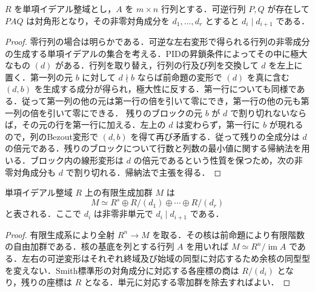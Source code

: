 \begin{prop}[Smith標準形]
$R$ を単項イデアル整域とし，$A$ を $m\times n$ 行列とする．可逆行列 $P,Q$ が存在して $PAQ$ は対角形となり，その非零対角成分を $d_1,\ldots,d_r$ とすると $d_i\mid d_{i+1}$ である．
\end{prop}
\begin{proof}
零行列の場合は明らかである．可逆な左右変形で得られる行列の非零成分の生成する単項イデアルの集合を考える．PIDの昇鎖条件によってその中に極大なもの $(d)$ がある．行列を取り替え，行列の行及び列を交換して $d$ を左上に置く．第一列の元 $b$ に対して $d\nmid b$ ならば前命題の変形で $(d)$ を真に含む $(d,b)$ を生成する成分が得られ，極大性に反する．第一行についても同様である．従って第一列の他の元は第一行の倍を引いて零にでき，第一行の他の元も第一列の倍を引いて零にできる．
残りのブロックの元 $b$ が $d$ で割り切れないならば，その元の行を第一行に加える．左上の $d$ は変わらず，第一行に $b$ が現れるので，列のBezout変形で $(d,b)$ を得て再び矛盾する．従って残りの全成分は $d$ の倍元である．残りのブロックについて行数と列数の最小値に関する帰納法を用いる．ブロック内の線形変形は $d$ の倍元であるという性質を保つため，次の非零対角成分も $d$ で割り切れる．帰納法で主張を得る．
\end{proof}
\begin{prop}[有限生成加群の構造]
単項イデアル整域 $R$ 上の有限生成加群 $M$ は
\[
M\simeq R^s\oplus R/(d_1)\oplus\cdots\oplus R/(d_r)
\]
と表される．ここで $d_i$ は非零非単元で $d_i\mid d_{i+1}$ である．
\end{prop}
\begin{proof}
有限生成系により全射 $R^n\to M$ を取る．その核は前命題により有限階数の自由加群である．核の基底を列とする行列 $A$ を用いれば $M\simeq R^n/\operatorname{im} A$ である．左右の可逆変形はそれぞれ終域及び始域の同型に対応するため余核の同型型を変えない．Smith標準形の対角成分に対応する各座標の商は $R/(d_i)$ となり，残りの座標は $R$ となる．単元に対応する零加群を除去すればよい．
\end{proof}
